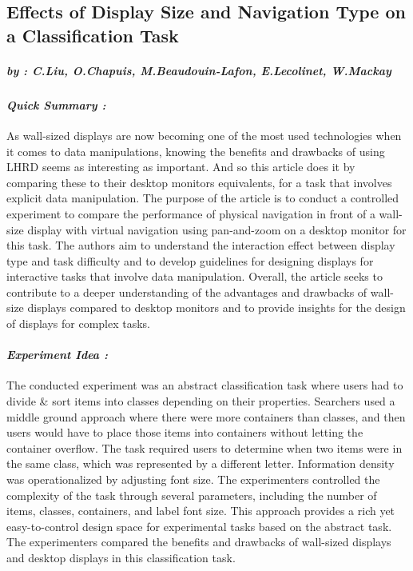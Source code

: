 
\subsection*{Effects of Display Size and Navigation Type on a Classification Task}
    \subparagraph{by : C.Liu, O.Chapuis, M.Beaudouin-Lafon, E.Lecolinet, W.Mackay}
    \cite{liu2014effects}

    \begin{multicols}{2}
        \paragraph{ \textit{Quick Summary :} 
                \newline }
        \indent \indent As wall-sized displays are now becoming one of the most used technologies when it comes to data manipulations, knowing the benefits and drawbacks of using LHRD seems as interesting as important. And so this article does 
        it by comparing these to their desktop monitors  equivalents, for a task that involves explicit data manipulation. The purpose of the article is to conduct a controlled experiment to compare the performance of physical navigation in 
        front of a wall-size display with virtual navigation using pan-and-zoom on a desktop monitor for this task. The authors aim to understand the interaction effect between display type and task difficulty and to develop guidelines 
        for designing displays for interactive tasks that involve data manipulation. Overall, the article seeks to contribute to a deeper understanding of the advantages and drawbacks of wall-size displays compared to desktop monitors and to 
        provide insights for the design of displays for complex tasks.

        \paragraph{ \textit{Experiment Idea :} 
                \newline }
        \indent \indent The conducted experiment was an abstract classification task where users had to divide \& sort items into classes depending on their properties. Searchers used a middle ground approach where there were more containers than classes, 
        and then users would have to place those items into containers without letting the container overflow. The task required users to determine when two items were in the same class, which was represented by a different letter. Information density was 
        operationalized by adjusting font size. The experimenters controlled the complexity of the task through several parameters, including the number of items, classes, containers, and label font size. This approach provides a rich yet easy-to-control 
        design space for experimental tasks based on the abstract task. The experimenters compared the benefits and drawbacks of wall-sized displays and desktop displays in this classification task.


\end{multicols}
